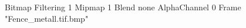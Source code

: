 {Bitmap
	{Filtering 1}
	{Mipmap 1}
	{Blend none}
	{AlphaChannel 0}
	{Frame "Fence_metall.tif.bmp"}
}
